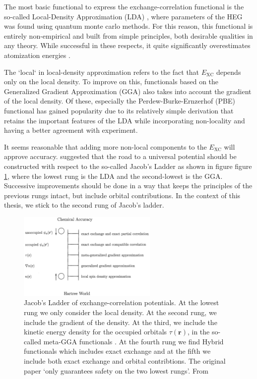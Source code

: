 The most basic functional to express the exchange-correlation functional is the so-called Local-Density Approximation (LDA) \cite{Ceperley1980, Perdew1981}, where parameters of the HEG was found using quantum monte carlo methods. For this reason, this functional is entirely non-empirical and built from simple principles, both desirable qualities in any theory. While successful in these respects, it quite significantly overestimates atomization energies \cite{Perdew2001}.

The `local` in local-density approximation refers to the fact that $E_\text{XC}$ depends only on the local density. To improve on this, functionals based on the Generalized Gradient Approximation (GGA) also takes into account the gradient of the local density. Of these, especially the Perdew-Burke-Ernzerhof (PBE) functional has gained popularity due to its relatively simple derivation that retains the important features of the LDA while incorporating non-locality and having a better agreement with experiment.

It seems reasonable that adding more non-local components to the $E_\text{XC}$ will approve accuracy. \citeauthor{Perdew2001} suggested that the road to a universal potential should be constructed with respect to the so-called Jacob's Ladder \cite{Perdew2001} as shown in figure figure \ref{fig:jacobs_ladder}, where the lowest rung is the LDA and the second-lowest is the GGA. Successive improvements should be done in a way that keeps the principles of the previous rungs intact, but include orbital contributions. In the context of this thesis, we stick to the second rung of Jacob's ladder.

\begin{figure}
	\centering
	\includegraphics[width=0.6\textwidth]{fig/method/dft/jacobs_ladder.png}
	\caption{Jacob's Ladder of exchange-correlation potentials. At the lowest rung we only consider the local density. At the second rung, we include the gradient of the density. At the third, we include the kinetic energy density for the occupied orbitals $\tau (\bm{r})$, in the so-called meta-GGA functionals \cite{Tao2003}. At the fourth rung we find  Hybrid functionals which includes exact exchange and at the fifth we include both exact exchange and orbital contribtions. The original paper \cite{Perdew2001} `only guarantees safety on the two lowest rungs'. From \cite{Perdew2001}}
	\label{fig:jacobs_ladder}
\end{figure}

